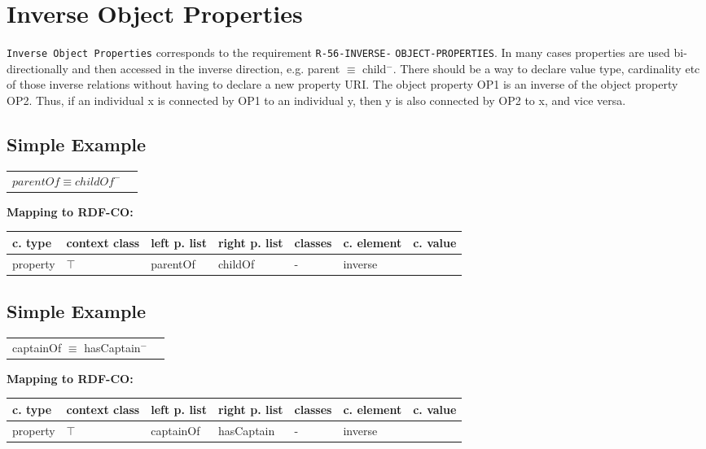 \documentclass{llncs}
\newcommand{\ms}[1]{\texttt{#1}}
\newenvironment{gcotable}{
  \scriptsize
  \sffamily
  \vspace{0cm}
	\begin{center}
	\textbf{\vspace{0.4cm}Mapping to RDF-CO:} \\
  \begin{tabular}{l|l|l|l|l|l|l}
	\hline
  \textbf{c. type} & \textbf{context class} & \textbf{left p. list} & \textbf{right p. list} & \textbf{classes} & \textbf{c. element} & \textbf{c. value} \\
  \hline

}{
  \hline
  \end{tabular}
	\end{center}
}
\newenvironment{DL}{
  \vspace{0cm}
	\begin{center}
  \begin{tabular}{r l}

}{
  \end{tabular}
	\end{center}
}
\begin{document}
\section{Inverse Object Properties}

\ms{Inverse Object Properties} corresponds to the requirement
\ms{R-56-INVERSE-} \ms{OBJECT-PROPERTIES}.
In many cases properties are used bi-directionally and then accessed in the inverse direction, e.g. parent $\equiv$ child$^{-}$. There should be a way to declare value type, cardinality etc of those inverse relations without having to declare a new property URI. 
The object property OP1 is an inverse of the object property OP2. 
Thus, if an individual x is connected by OP1 to an individual y, then y is also connected by OP2 to x, and vice versa.

\subsection{Simple Example}

\begin{DL}
$parentOf \equiv childOf^{-}$ \\
\end{DL}

\begin{gcotable}
property & $\top$ & parentOf & childOf & - & inverse \\
\end{gcotable}

%

\subsection{Simple Example}

\begin{DL}
captainOf $\equiv$ hasCaptain$^{-}$ \\
\end{DL}

\begin{gcotable}
property & $\top$ & captainOf & hasCaptain & - & inverse \\
\end{gcotable}

%
%
%
\end{document}
